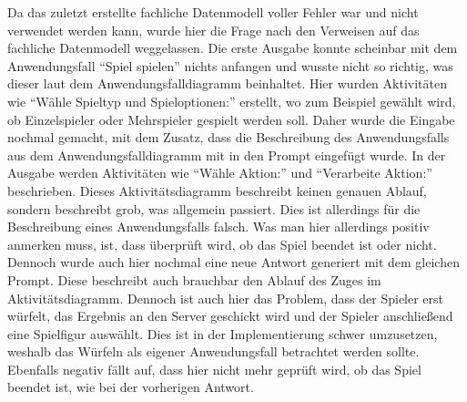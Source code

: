 Da das zuletzt erstellte fachliche Datenmodell voller Fehler war und nicht verwendet werden kann, wurde hier die Frage nach den Verweisen 
auf das fachliche Datenmodell weggelassen. Die erste Ausgabe konnte scheinbar mit dem Anwendungsfall ``Spiel spielen'' nichts anfangen und 
wusste nicht so richtig, was dieser laut dem Anwendungsfalldiagramm beinhaltet. Hier wurden Aktivitäten wie ``Wähle Spieltyp und Spieloptionen:'' 
erstellt, wo zum Beispiel gewählt wird, ob Einzelspieler oder Mehrspieler gespielt werden soll. Daher wurde die Eingabe nochmal gemacht, 
mit dem Zusatz, dass die Beschreibung des Anwendungsfalls aus dem Anwendungsfalldiagramm mit in den Prompt eingefügt wurde. In der Ausgabe 
werden Aktivitäten wie ``Wähle Aktion:'' und ``Verarbeite Aktion:'' beschrieben. Dieses Aktivitätsdiagramm beschreibt keinen genauen Ablauf, 
sondern beschreibt grob, was allgemein passiert. Dies ist allerdings für die Beschreibung eines Anwendungsfalls falsch. Was man hier allerdings 
positiv anmerken muss, ist, dass überprüft wird, ob das Spiel beendet ist oder nicht. Dennoch wurde auch hier nochmal eine neue Antwort 
generiert mit dem gleichen Prompt. Diese beschreibt auch brauchbar den Ablauf des Zuges im Aktivitätsdiagramm. Dennoch ist auch hier das 
Problem, dass der Spieler erst würfelt, das Ergebnis an den Server geschickt wird und der Spieler anschließend eine Spielfigur auswählt. 
Dies ist in der Implementierung schwer umzusetzen, weshalb das Würfeln als eigener Anwendungsfall betrachtet werden sollte. Ebenfalls 
negativ fällt auf, dass hier nicht mehr geprüft wird, ob das Spiel beendet ist, wie bei der vorherigen Antwort.

